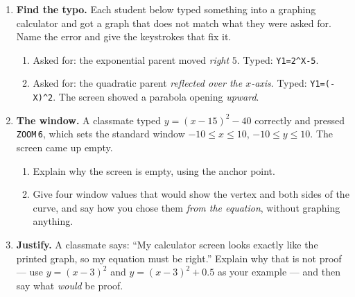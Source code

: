 \documentclass[10pt]{article}
\begin{document}
\boxguard[30]
\begin{tcolorbox}[colback=white, colframe=black!40, title=\textbf{Tier E --- Extension},
    fonttitle=\bfseries, arc=2mm, left=3mm, right=3mm, top=2mm, bottom=2mm, breakable]
\small

\begin{enumerate}[leftmargin=1.6em, itemsep=4pt, topsep=2pt]
  \item \textbf{Find the typo.} Each student below typed something into a graphing calculator and
        got a graph that does not match what they were asked for. Name the error and give the
        keystrokes that fix it.
        \begin{enumerate}[label=(\alph*), leftmargin=1.6em, itemsep=3pt, topsep=3pt]
          \item Asked for: the exponential parent moved \emph{right} $5$. Typed:
                \texttt{Y1=2\^{}X-5}.


          \item Asked for: the quadratic parent \emph{reflected over the $x$-axis}. Typed:
                \texttt{Y1=(-X)\^{}2}. The screen showed a parabola opening \emph{upward}.

        \end{enumerate}

  \item \textbf{The window.} A classmate typed $y=(x-15)^2-40$ correctly and pressed
        \texttt{ZOOM}\,\texttt{6}, which sets the standard window $-10 \le x \le 10$,
        $-10 \le y \le 10$. The screen came up empty.
        \begin{enumerate}[label=(\alph*), leftmargin=1.6em, itemsep=3pt, topsep=3pt]
          \item Explain why the screen is empty, using the anchor point.


          \item Give four window values that would show the vertex and both sides of the curve, and
                say how you chose them \emph{from the equation}, without graphing anything.

        \end{enumerate}

  \item \textbf{Justify.} A classmate says: ``My calculator screen looks exactly like the printed
        graph, so my equation must be right.'' Explain why that is not proof --- use $y=(x-3)^2$ and
        $y=(x-3)^2+0.5$ as your example --- and then say what \emph{would} be proof.

\end{enumerate}
\end{tcolorbox}
\end{document}
